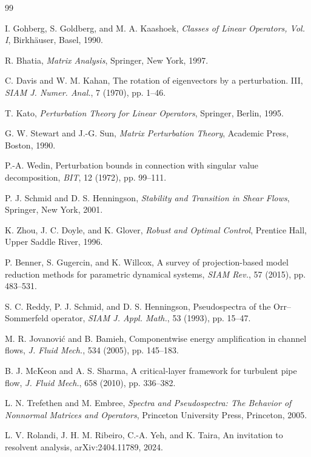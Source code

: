 \documentclass[review]{siamart220329}
\theoremstyle{definition}
\theoremstyle{remark}
\begin{document}
\begin{thebibliography}{99}

I. Gohberg, S. Goldberg, and M. A. Kaashoek, \emph{Classes of Linear Operators, Vol. I}, Birkh\"auser, Basel, 1990.

R. Bhatia, \emph{Matrix Analysis}, Springer, New York, 1997.

C. Davis and W. M. Kahan, The rotation of eigenvectors by a perturbation. III, \emph{SIAM J. Numer. Anal.}, 7 (1970), pp. 1--46.

T. Kato, \emph{Perturbation Theory for Linear Operators}, Springer, Berlin, 1995.

G. W. Stewart and J.-G. Sun, \emph{Matrix Perturbation Theory}, Academic Press, Boston, 1990.

P.-A. Wedin, Perturbation bounds in connection with singular value decomposition, \emph{BIT}, 12 (1972), pp. 99--111.

P. J. Schmid and D. S. Henningson, \emph{Stability and Transition in Shear Flows}, Springer, New York, 2001.

K. Zhou, J. C. Doyle, and K. Glover, \emph{Robust and Optimal Control}, Prentice Hall, Upper Saddle River, 1996.

P. Benner, S. Gugercin, and K. Willcox, A survey of projection-based model reduction methods for parametric dynamical systems, \emph{SIAM Rev.}, 57 (2015), pp. 483--531.

S. C. Reddy, P. J. Schmid, and D. S. Henningson, Pseudospectra of the Orr--Sommerfeld operator, \emph{SIAM J. Appl. Math.}, 53 (1993), pp. 15--47.

M. R. Jovanovi\'c and B. Bamieh, Componentwise energy amplification in channel flows, \emph{J. Fluid Mech.}, 534 (2005), pp. 145--183.

B. J. McKeon and A. S. Sharma, A critical-layer framework for turbulent pipe flow, \emph{J. Fluid Mech.}, 658 (2010), pp. 336--382.

L. N. Trefethen and M. Embree, \emph{Spectra and Pseudospectra: The Behavior of Nonnormal Matrices and Operators}, Princeton University Press, Princeton, 2005.


L. V. Rolandi, J. H. M. Ribeiro, C.-A. Yeh, and K. Taira, An invitation to resolvent analysis, arXiv:2404.11789, 2024.


\end{thebibliography}
\end{document}
